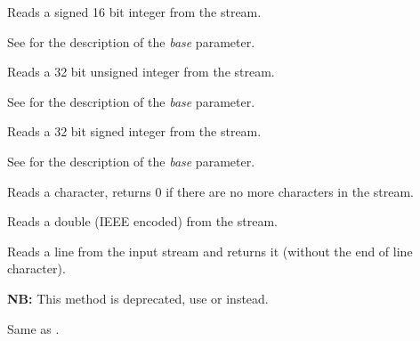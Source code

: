 
Reads a signed 16 bit integer from the stream.

See  for the
description of the {\it base} parameter.


\label{wxtextinputstreamread32}


Reads a 32 bit unsigned integer from the stream.

See  for the
description of the {\it base} parameter.


\label{wxtextinputstreamread32s}


Reads a 32 bit signed integer from the stream.

See  for the
description of the {\it base} parameter.


\label{wxtextinputstreamgetchar}


Reads a character, returns $0$ if there are no more characters in the stream.


\label{wxtextinputstreamreaddouble}


Reads a double (IEEE encoded) from the stream.


\label{wxtextinputstreamreadline}


Reads a line from the input stream and returns it (without the end of line
character).


\label{wxtextinputstreamreadstring}


{\bf NB:} This method is deprecated, use  
or  instead.

Same as .


